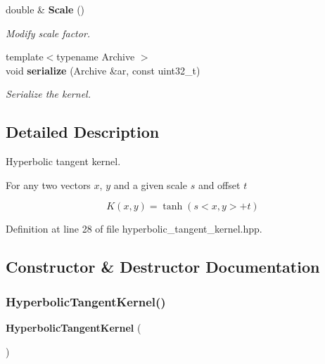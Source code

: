 \begin{DoxyCompactItemize}
double \& \textbf{ Scale} ()
\begin{DoxyCompactList}\small\item\em Modify scale factor. \end{DoxyCompactList}\item 
{\footnotesize template$<$typename Archive $>$ }\\void \textbf{ serialize} (Archive \&ar, const uint32\+\_\+t)
\begin{DoxyCompactList}\small\item\em Serialize the kernel. \end{DoxyCompactList}\end{DoxyCompactItemize}


\subsection{Detailed Description}
Hyperbolic tangent kernel. 

For any two vectors $ x $, $ y $ and a given scale $ s $ and offset $ t $

\[ K(x, y) = \tanh(s <x, y> + t) \] 

Definition at line 28 of file hyperbolic\+\_\+tangent\+\_\+kernel.\+hpp.



\subsection{Constructor \& Destructor Documentation}
\mbox{\label{classmlpack_1_1kernel_1_1HyperbolicTangentKernel_a034bf026d167ae52a3d35d5bd8f552e7}} 
\subsubsection{Hyperbolic\+Tangent\+Kernel()\hspace{0.1cm}{\footnotesize\ttfamily [1/2]}}
{\footnotesize\ttfamily \textbf{ Hyperbolic\+Tangent\+Kernel} (\begin{DoxyParamCaption}{ }\end{DoxyParamCaption})\hspace{0.3cm}{\ttfamily [inline]}}



